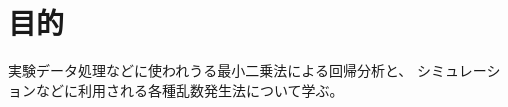 \documentclass[../../../main]{subfiles}
\begin{document}
\section{目的}

実験データ処理などに使われうる最小二乗法による回帰分析と、
シミュレーションなどに利用される各種乱数発生法について学ぶ。
\end{document}
